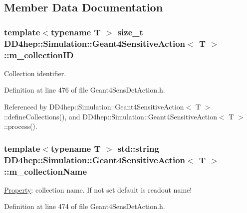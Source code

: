\subsection{Member Data Documentation}
\hypertarget{class_d_d4hep_1_1_simulation_1_1_geant4_sensitive_action_aa73c450b64116d4e52be7accbef7bea9}{
\subsubsection[{m\_\-collectionID}]{\setlength{\rightskip}{0pt plus 5cm}template$<$typename T $>$ size\_\-t {\bf DD4hep::Simulation::Geant4SensitiveAction}$<$ T $>$::{\bf m\_\-collectionID}}}
\label{class_d_d4hep_1_1_simulation_1_1_geant4_sensitive_action_aa73c450b64116d4e52be7accbef7bea9}


Collection identifier. 

Definition at line 476 of file Geant4SensDetAction.h.

Referenced by DD4hep::Simulation::Geant4SensitiveAction$<$ T $>$::defineCollections(), and DD4hep::Simulation::Geant4SensitiveAction$<$ T $>$::process().\hypertarget{class_d_d4hep_1_1_simulation_1_1_geant4_sensitive_action_a63934f5c71f72677f47b6666dbedba69}{
\subsubsection[{m\_\-collectionName}]{\setlength{\rightskip}{0pt plus 5cm}template$<$typename T $>$ std::string {\bf DD4hep::Simulation::Geant4SensitiveAction}$<$ T $>$::{\bf m\_\-collectionName}}}
\label{class_d_d4hep_1_1_simulation_1_1_geant4_sensitive_action_a63934f5c71f72677f47b6666dbedba69}


\hyperlink{class_d_d4hep_1_1_property}{Property}: collection name. If not set default is readout name! 

Definition at line 474 of file Geant4SensDetAction.h.

